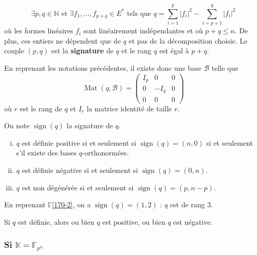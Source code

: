 	\begin{theorem}
		\[ \exists p, q \in \mathbb{N} \text{ et } \exists f_1, \dots, f_{p+q} \in E^* \text{ tels que } q = \sum_{i=1}^p |f_i|^2 - \sum_{i=p+1}^q |f_i|^2 \]
		où les formes linéaires $f_i$ sont linéairement indépendantes et où $p + q \leq n$. De plus, ces entiers ne dépendent que de $q$ et pas de la décomposition choisie.
		\newpar
		Le couple $(p,q)$ est la \textbf{signature} de $q$ et le rang $q$ est égal à $p+q$.
	\end{theorem}

	\begin{remark}
		En reprenant les notations précédentes, il existe donc une base $\mathcal{B}$ telle que
		\[
		\operatorname{Mat}(q, \mathcal{B}) =
		\begin{pmatrix}
			I_p & 0 & 0 \\
			0 & -I_q & 0 \\
			0 & 0 & 0
		\end{pmatrix}
		\]
		où $r$ est le rang de $q$ et $I_r$ la matrice identité de taille $r$.
	\end{remark}


	\begin{corollary}
		On note $\operatorname{sign}(q)$ la signature de $q$.
		\begin{enumerate}[(i)]
			\item $q$ est définie positive si et seulement si $\operatorname{sign}(q) = (n, 0)$ si et seulement s'il existe des bases $q$-orthonormées.
			\item $q$ est définie négative si et seulement si $\operatorname{sign}(q) = (0, n)$.
			\item $q$ est non dégénérée si et seulement si $\operatorname{sign}(q) = (p, n-p)$.
		\end{enumerate}
	\end{corollary}


	\begin{example}
		En reprenant l'\cref{170-2}, on a $\operatorname{sign}(q) = (1,2)$ : $q$ est de rang $3$.
	\end{example}

	\begin{proposition}
		Si $q$ est définie, alors ou bien $q$ est positive, ou bien $q$ est négative.
	\end{proposition}

	\subsubsection{Si \texorpdfstring{$\mathbb{K} = \mathbb{F}_{p^n}$}{K = Fₚₙ}}

